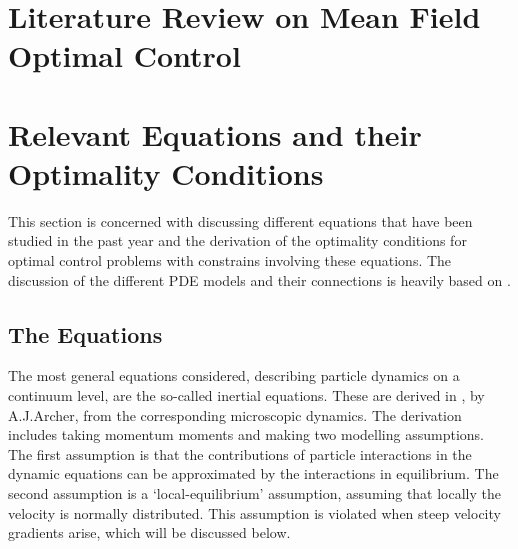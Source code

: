 \documentclass[11pt, a4paper]{article}
\theoremstyle{definition}
\begin{document}
\section{Literature Review on Mean Field Optimal Control}

\section{Relevant Equations and their Optimality Conditions}
This section is concerned with discussing different equations that have been studied in the past year and the derivation of the optimality conditions for optimal control problems with constrains involving these equations. The discussion of the different PDE models and their connections is heavily based on \cite{Archer1}.

\subsection{The Equations}
The most general equations considered, describing particle dynamics on a continuum level, are the so-called inertial equations. These are derived in \cite{Archer1}, by A.J.Archer, from the corresponding microscopic dynamics. The derivation includes taking momentum moments and making two modelling assumptions. The first assumption is that the contributions of particle interactions in the dynamic equations can be approximated by the interactions in equilibrium. The second assumption is a `local-equilibrium' assumption, assuming that locally the velocity is normally distributed. This assumption is violated when steep velocity gradients arise, which will be discussed below.
\end{document}
